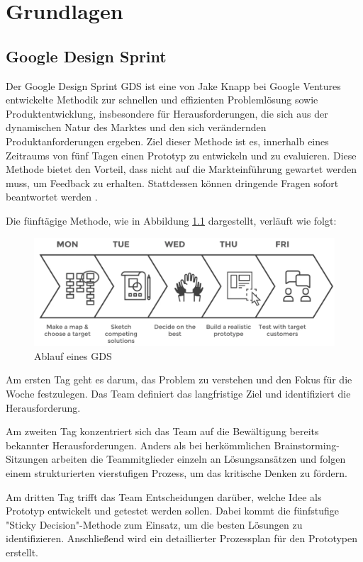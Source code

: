 \chapter{Grundlagen}

\section{Google Design Sprint}

Der Google Design Sprint \ac{GDS} ist eine von Jake Knapp bei Google Ventures entwickelte Methodik zur schnellen und effizienten Problemlösung sowie Produktentwicklung, insbesondere für Herausforderungen, die sich aus der dynamischen Natur des Marktes und den sich verändernden Produktanforderungen ergeben. 
Ziel dieser Methode ist es, innerhalb eines Zeitraums von fünf Tagen einen Prototyp zu entwickeln und zu evaluieren. 
Diese Methode bietet den Vorteil, dass nicht auf die Markteinführung gewartet werden muss, um Feedback zu erhalten. Stattdessen können dringende Fragen sofort beantwortet werden \cite[S.98 f.]{Design_Sprint}.

Die fünftägige Methode, wie in Abbildung \ref{GDS} dargestellt, verläuft wie folgt:

\begin{figure}[h]
    \centering
    \includegraphics[clip,width=0.75\linewidth]{images/GDS.png}
    \caption[Ablauf eines GDS]{Ablauf eines GDS \cite{GDS_Abbildung}}
    \label{GDS}
\end{figure}

Am ersten Tag geht es darum, das Problem zu verstehen und den Fokus für die Woche festzulegen. Das Team definiert das langfristige Ziel und identifiziert die Herausforderung. 

Am zweiten Tag konzentriert sich das Team auf die Bewältigung bereits bekannter Herausforderungen. Anders als bei herkömmlichen Brainstorming-Sitzungen arbeiten die Teammitglieder einzeln an Lösungsansätzen und folgen einem strukturierten vierstufigen Prozess, um das kritische Denken zu fördern. 

Am dritten Tag trifft das Team Entscheidungen darüber, welche Idee als Prototyp entwickelt und getestet werden sollen. Dabei kommt die fünfstufige "Sticky Decision"-Methode zum Einsatz, um die besten Lösungen zu identifizieren. Anschließend wird ein detaillierter Prozessplan für den Prototypen erstellt. 

